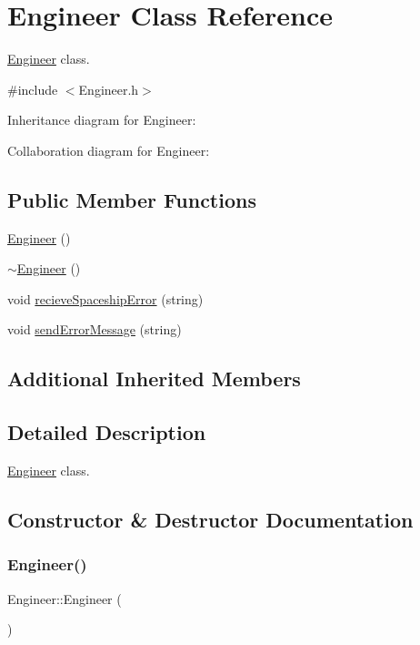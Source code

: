 \hypertarget{classEngineer}{}\section{Engineer Class Reference}
\label{classEngineer}


\hyperlink{classEngineer}{Engineer} class.  




{\ttfamily \#include $<$Engineer.\+h$>$}



Inheritance diagram for Engineer\+:


Collaboration diagram for Engineer\+:
\subsection*{Public Member Functions}
\begin{DoxyCompactItemize}
\item 
\hyperlink{classEngineer_acf0604e3e44a09583b420c729b651ad7}{Engineer} ()
\item 
\hyperlink{classEngineer_a953bdbf091d5bd435d0c9a276f05cb3b}{$\sim$\+Engineer} ()
\item 
void \hyperlink{classEngineer_acc86ce6b4b1388be8ebacc685f9e6233}{recieve\+Spaceship\+Error} (string)
\item 
void \hyperlink{classEngineer_ae60806f33b7f226891dbb7ad9b8a0c0b}{send\+Error\+Message} (string)
\end{DoxyCompactItemize}
\subsection*{Additional Inherited Members}


\subsection{Detailed Description}
\hyperlink{classEngineer}{Engineer} class. 

\subsection{Constructor \& Destructor Documentation}
\mbox{\label{classEngineer_acf0604e3e44a09583b420c729b651ad7}} 
\subsubsection{\texorpdfstring{Engineer()}{Engineer()}}
{\footnotesize\ttfamily Engineer\+::\+Engineer (\begin{DoxyParamCaption}{ }\end{DoxyParamCaption})\hspace{0.3cm}{\ttfamily [inline]}}

